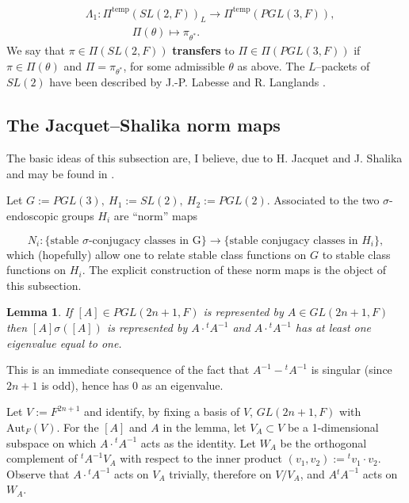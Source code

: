 \documentclass[12pt,letterpaper]{article}
\newtheorem{lemma}[theorem]{Lemma}
\begin{document}
\begin{equation}
\label{eqn:1.8}
\begin{split}
&\Lambda_1 : \Pi^{\text{temp}}(SL(2,F))_L \rightarrow 
\Pi^{\text{temp}}(PGL(3,F)),\\
&\quad\quad \ \ \ \ \ \ \ \ \ \ \Pi (\theta ) \longmapsto \pi_{\theta^*}.
\end{split} 
\end{equation}
We say that $\pi \in \Pi (SL(2,F))$ {\bf transfers} to 
$\Pi \in \Pi (PGL(3,F))$ if $\pi \in \Pi (\theta )$ and 
$\Pi = \pi_{\theta^*}$, for some admissible $\theta$ as above. 
The $L$--packets of $SL(2)$ have been described by J.-P. Labesse
and R. Langlands \cite{LL}.

\subsection{The Jacquet--Shalika norm maps}
\label{sec:1.3}

The basic ideas of this subsection are, I believe, due to H. Jacquet
and J. Shalika and may be found in \cite{La1}.
 
Let $G := PGL(3),\ H_1 := SL(2),\ H_2 := PGL(2)$.
Associated to the two $\sigma$-endoscopic groups $H_i$ are ``norm'' maps

\begin{equation}
\label{eqn:1.9}
N_i : \{\text{stable $\sigma$-conjugacy classes in G}\} \rightarrow
\{\text{stable conjugacy classes in $H_i$}\},
\end{equation}
which (hopefully) allow one to relate stable class functions on $G$ to stable
class functions on $H_i$. The explicit construction of these norm maps
is the object of this subsection.

\begin{lemma}
\label{lemma:1.10} 
If $[A] \in PGL(2n+1,F)$ is represented by
$A \in GL(2n+1,F)$ then $[A]\sigma ([A])$ is represented by 
$A\cdot {^{t}A^{-1}}$
and $A\cdot {^{t}A^{-1}}$ has at least one eigenvalue equal to one.
\end{lemma}
 
This is an immediate consequence of the fact that $A^{-1} - {^{t}A^{-1}}$
is singular (since $2n+1$ is odd), hence has $0$ as an eigenvalue.
 
Let $V:=F^{2n+1}$ and identify, by fixing a basis of $V$, $GL(2n+1,F)$ with 
$\text{Aut}_F(V)$. For the $[A]$ and $A$ in the lemma, let 
$V_A \subset V$ be a 1-dimensional subspace on which $A\cdot {^{t}A^{-1}}$
acts as the identity. Let $W_A$ be the orthogonal complement of
${^{t}A^{-1}}V_A$ with respect to the inner product 
$(v_1,v_2) := {^{t}v_1\cdot v_2}$.
Observe that $A\cdot {^{t}A^{-1}}$ acts on $V_A$ trivially, 
therefore on $V/V_A$, and
$A{^{t}A^{-1}}$ acts on $W_A$. 
 
\end{document}
